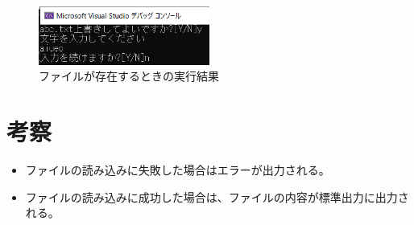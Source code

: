 \documentclass[dvipdfmx]{jsarticle}
\begin{document}
\begin{figure}[ht]
  \centering
  \includegraphics[width=0.5\textwidth]{./img/result_pr1_dup.png}
  \caption{ファイルが存在するときの実行結果}
  \label{fig:result_pr1_dup}
\end{figure}



\section{考察}
\begin{itemize}
  \item ファイルの読み込みに失敗した場合はエラーが出力される。
  \item ファイルの読み込みに成功した場合は、ファイルの内容が標準出力に出力される。
\end{itemize}
\end{document}
